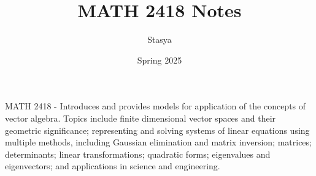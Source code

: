 \documentclass[10pt,a4paper,oneside]{book}
\title{MATH 2418 Notes}
\author{Stasya}
\date{Spring 2025}
\begin{document}
\maketitle
\bigbreak
\begin{center}
    MATH 2418 - Introduces and provides models for application of the concepts of vector algebra. Topics include finite 
    dimensional vector spaces and their geometric significance; representing and solving systems of linear equations using 
    multiple methods, including Gaussian elimination and matrix inversion; matrices; determinants; linear transformations; 
    quadratic forms; eigenvalues and eigenvectors; and applications in science and engineering. 
\end{center}
\bigbreak
\tableofcontents

\end{document}
